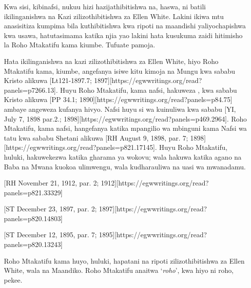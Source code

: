 Kwa sisi, kibinafsi, nukuu hizi hazijathibitishwa na, haswa, ni batili ikilinganishwa na Kazi zilizothibitishwa za Ellen White. Lakini ikiwa mtu anasisitiza kumpima bila kuthibitishwa kwa ripoti na maandishi yaliyochapishwa kwa usawa, hatutasimama katika njia yao lakini hata kusukuma zaidi hitimisho la Roho Mtakatifu kama kiumbe. Tufuate pamoja.


Hata ikilinganishwa na kazi zilizothibitishwa za Ellen White, hiyo Roho Mtakatifu kama, kiumbe, angefanya isiwe kitu kimoja na Mungu kwa sababu Kristo alikuwa [Lt121-1897.7; 1897][https://egwwritings.org/read?panels=p7266.13]. Huyu Roho Mtakatifu, kama nafsi, hakuweza , kwa sababu Kristo alikuwa [PP 34.1; 1890][https://egwwritings.org/read?panels=p84.75] ambaye angeweza kufanya hivyo. Nafsi huyu si wa kuinuliwa kwa sababu [YI, July 7, 1898 par.2.; 1898][https://egwwritings.org/read?panels=p469.2964]. Roho Mtakatifu, kama nafsi, hangefanya katika mpangilio wa mbinguni kama Nafsi wa tatu kwa sababu Shetani alikuwa [RH August 9, 1898, par. 7; 1898][https://egwwritings.org/read?panels=p821.17145]. Huyu Roho Mtakatifu, huluki, hakuwekezwa katika gharama ya wokovu; wala hakuwa katika agano na Baba na Mwana kuokoa ulimwengu, wala kudharauliwa na uasi wa mwanadamu.


[RH November 21, 1912, par. 2; 1912][https://egwwritings.org/read?panels=p821.33329]


[ST December 23, 1897, par. 2; 1897][https://egwwritings.org/read?panels=p820.14803]


[ST December 12, 1895, par. 7; 1895][https://egwwritings.org/read?panels=p820.13243]



Roho Mtakatifu kama huyo, huluki, hapatani na ripoti zilizothibitishwa za Ellen White, wala na Maandiko. Roho Mtakatifu anaitwa ‘\textit{roho}’, kwa hiyo ni roho, pekee.


